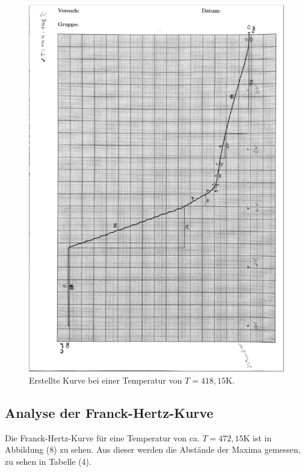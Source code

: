 \begin{figure}[H]
  \centering
  \includegraphics{b.PNG}
  \caption{Erstellte Kurve bei einer Temperatur von $T=418,15$K.}
  \label{fig:plot}
\end{figure}

\subsection{Analyse der Franck-Hertz-Kurve}
Die Franck-Hertz-Kurve für eine Temperatur von ca. $T=472,15 \si{\K}$ ist in Abbildung (8) zu sehen.
Aus dieser werden die Abstände der Maxima gemessen, zu sehen in Tabelle (4).

